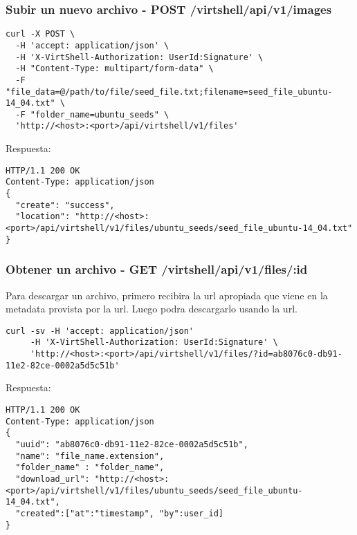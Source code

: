 \subsubsection{Subir un nuevo archivo - POST /virtshell/api/v1/images}

\begin{lstlisting}[style=json]
curl -X POST \
  -H 'accept: application/json' \
  -H 'X-VirtShell-Authorization: UserId:Signature' \
  -H "Content-Type: multipart/form-data" \
  -F "file_data=@/path/to/file/seed_file.txt;filename=seed_file_ubuntu-14_04.txt" \
  -F "folder_name=ubuntu_seeds" \
  'http://<host>:<port>/api/virtshell/v1/files'
\end{lstlisting}

\vspace{1cm}
Respuesta:
\vspace{1cm}

\begin{lstlisting}[style=json]
HTTP/1.1 200 OK
Content-Type: application/json
{ 
  "create": "success",
  "location": "http://<host>:<port>/api/virtshell/v1/files/ubuntu_seeds/seed_file_ubuntu-14_04.txt" 
}
\end{lstlisting}

\subsubsection{Obtener un archivo - GET /virtshell/api/v1/files/:id}

Para descargar un archivo, primero recibira la url apropiada que viene en la metadata provista por la url. Luego podra descargarlo usando la url.

\begin{lstlisting}[style=json]
curl -sv -H 'accept: application/json' 
     -H 'X-VirtShell-Authorization: UserId:Signature' \ 
     'http://<host>:<port>/api/virtshell/v1/files/?id=ab8076c0-db91-11e2-82ce-0002a5d5c51b'
\end{lstlisting}

\vspace{1cm}
Respuesta:
\vspace{1cm}

\begin{lstlisting}[style=json]
HTTP/1.1 200 OK
Content-Type: application/json
{
  "uuid": "ab8076c0-db91-11e2-82ce-0002a5d5c51b",
  "name": "file_name.extension",
  "folder_name" : "folder_name",
  "download_url": "http://<host>:<port>/api/virtshell/v1/files/ubuntu_seeds/seed_file_ubuntu-14_04.txt",
  "created":["at":"timestamp", "by":user_id] 
}
\end{lstlisting}

